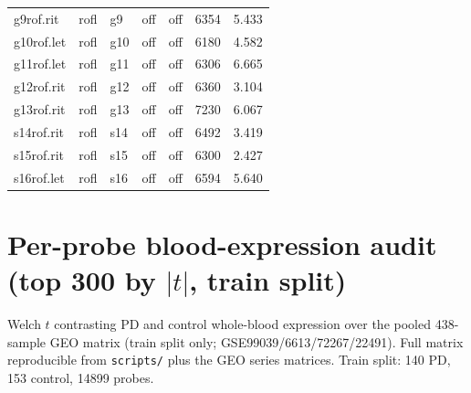 \begin{footnotesize}
\begin{longtable}{lllllrr}
g9rof.rit & rofl & g9 & off & off & 6354 & 5.433 \\
g10rof.let & rofl & g10 & off & off & 6180 & 4.582 \\
g11rof.let & rofl & g11 & off & off & 6306 & 6.665 \\
g12rof.rit & rofl & g12 & off & off & 6360 & 3.104 \\
g13rof.rit & rofl & g13 & off & off & 7230 & 6.067 \\
s14rof.rit & rofl & s14 & off & off & 6492 & 3.419 \\
s15rof.rit & rofl & s15 & off & off & 6300 & 2.427 \\
s16rof.let & rofl & s16 & off & off & 6594 & 5.640 \\
\end{longtable}\end{footnotesize}
\section{Per-probe blood-expression audit (top 300 by $|t|$, train split)}
Welch $t$ contrasting PD and control whole-blood expression over the pooled 438-sample GEO matrix (train split only; GSE99039/6613/72267/22491). Full matrix reproducible from \texttt{scripts/} plus the GEO series matrices.
Train split: 140 PD, 153 control, 14899 probes.
